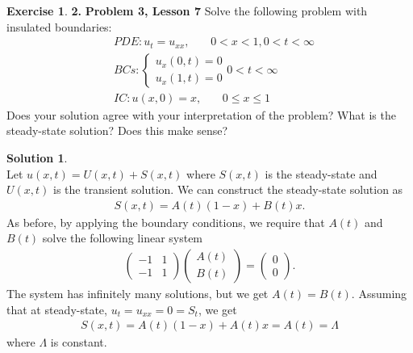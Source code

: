 \documentclass{book}
\theoremstyle{definition}
\newtheorem*{exer*}{Exercise}
\newtheorem*{sln*}{Solution}
\begin{document}
\begin{exer*}\textbf{2. }\textbf{Problem 3, Lesson 7}
	Solve the following problem with insulated boundaries:
	\begin{align*}
	&PDE: u_t = u_{xx},\,\,\,\,\,\,\,\,\,\,\, 0<x<1, 0<t<\infty\\
	&BCs:  
	\begin{cases}
	u_x(0,t) = 0\\
	u_x(1,t) = 0
	\end{cases} 0 < t < \infty\\
	&IC: u(x,0) = x,\,\,\,\,\,\,\,\,\,\,\, 0 \leq x\leq 1
	\end{align*}
	Does your solution agree with your interpretation of the problem? What is the steady-state solution? Does this make sense? 
	\begin{sln*}
		$\,$\\
		
		Let $u(x,t) = U(x,t) + S(x,t)$ where $S(x,t)$ is the steady-state and $U(x,t)$ is the transient solution. We can construct the steady-state solution as
		\begin{align*}
		S(x,t) = A(t)\left(1 -x \right) + B(t)x.
		\end{align*}
		As before, by applying the boundary conditions, we require that $A(t)$ and $B(t)$ solve the following linear system
		\begin{align*}
		\begin{pmatrix}
		-1 & 1\\
		-1 & 1
		\end{pmatrix}
		\begin{pmatrix}
		A(t) \\ B(t)
		\end{pmatrix}
		=
		\begin{pmatrix}
		0\\0
		\end{pmatrix}.
		\end{align*}
		The system has infinitely many solutions, but we get $A(t) = B(t)$. Assuming that at steady-state, $u_t = u_{xx} = 0 = S_t$, we get
		\begin{align*}
		S(x,t) = A(t)(1-x) + A(t)x = A(t) = \Lambda
		\end{align*}
		where $\Lambda$ is constant.\\
		

\end{sln*}
\end{exer*}
\end{document}
